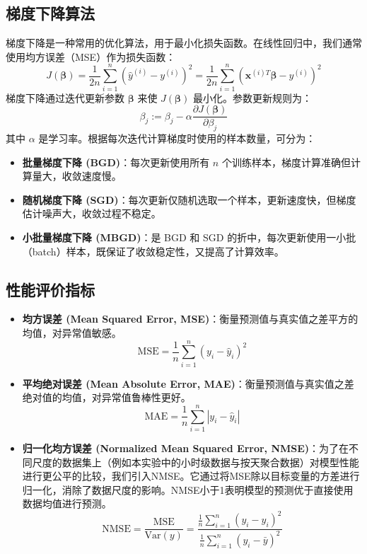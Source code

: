 \documentclass[UTF8,a4paper,10pt]{ctexart}
\begin{document}
\subsection{梯度下降算法}
梯度下降是一种常用的优化算法，用于最小化损失函数。在线性回归中，我们通常使用均方误差（MSE）作为损失函数：
$$
J(\boldsymbol{\beta}) = \frac{1}{2n} \sum_{i=1}^{n} (\hat{y}^{(i)} - y^{(i)})^2 = \frac{1}{2n} \sum_{i=1}^{n} (\mathbf{x}^{(i)T}\boldsymbol{\beta} - y^{(i)})^2
$$
梯度下降通过迭代更新参数 $\boldsymbol{\beta}$ 来使 $J(\boldsymbol{\beta})$ 最小化。参数更新规则为：
$$
\beta_j := \beta_j - \alpha \frac{\partial J(\boldsymbol{\beta})}{\partial \beta_j}
$$
其中 $\alpha$ 是学习率。根据每次迭代计算梯度时使用的样本数量，可分为：
\begin{itemize}
    \item \textbf{批量梯度下降 (BGD)}：每次更新使用所有 $n$ 个训练样本，梯度计算准确但计算量大，收敛速度慢。
    \item \textbf{随机梯度下降 (SGD)}：每次更新仅随机选取一个样本，更新速度快，但梯度估计噪声大，收敛过程不稳定。
    \item \textbf{小批量梯度下降 (MBGD)}：是 BGD 和 SGD 的折中，每次更新使用一小批（batch）样本，既保证了收敛稳定性，又提高了计算效率。
\end{itemize}

\subsection{性能评价指标}
\begin{itemize}
    \item \textbf{均方误差 (Mean Squared Error, MSE)}：衡量预测值与真实值之差平方的均值，对异常值敏感。
    $$
    \text{MSE} = \frac{1}{n} \sum_{i=1}^{n} (y_i - \hat{y}_i)^2
    $$

    \item \textbf{平均绝对误差 (Mean Absolute Error, MAE)}：衡量预测值与真实值之差绝对值的均值，对异常值鲁棒性更好。
    $$
    \text{MAE} = \frac{1}{n} \sum_{i=1}^{n} |y_i - \hat{y}_i|
    $$
    \item \textbf{归一化均方误差 (Normalized Mean Squared Error, NMSE)}：为了在不同尺度的数据集上（例如本实验中的小时级数据与按天聚合数据）对模型性能进行更公平的比较，我们引入NMSE。它通过将MSE除以目标变量的方差进行归一化，消除了数据尺度的影响。NMSE小于1表明模型的预测优于直接使用数据均值进行预测。
    $$
    \text{NMSE} = \frac{\text{MSE}}{\text{Var}(y)} = \frac{\frac{1}{n} \sum_{i=1}^{n} (y_i - \hat{y}_i)^2}{\frac{1}{n} \sum_{i=1}^{n} (y_i - \bar{y})^2}
    $$
\end{itemize}
\end{document}
